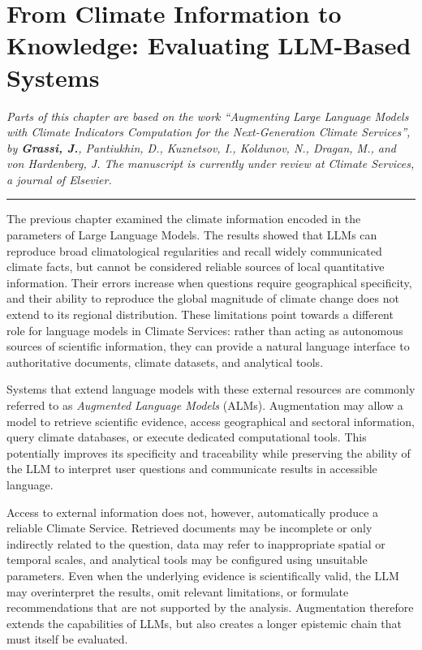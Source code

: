 \chapter{From Climate Information to Knowledge: Evaluating LLM-Based Systems}

\noindent\textit{Parts of this chapter are based on the work \emph{``Augmenting Large Language Models with Climate Indicators Computation for the Next-Generation Climate Services''}, by \textbf{Grassi, J.}, Pantiukhin, D., Kuznetsov, I., Koldunov, N., Dragan, M., and von Hardenberg, J. The manuscript is currently under review at Climate Services, a journal of Elsevier.}

\vspace{0.5em}
\begin{center}
    \rule{0.5\textwidth}{0.4pt}
\end{center}
\vspace{0.5em}


The previous chapter examined the climate information encoded in the parameters of Large Language Models. The results showed that LLMs can reproduce broad climatological regularities and recall widely communicated climate facts, but cannot be considered reliable sources of local quantitative information. Their errors increase when questions require geographical specificity, and their ability to reproduce the global magnitude of climate change does not extend to its regional distribution. These limitations point towards a different role for language models in Climate Services: rather than acting as autonomous sources of scientific information, they can provide a natural language interface to authoritative documents, climate datasets, and analytical tools.

Systems that extend language models with these external resources are commonly referred to as \emph{Augmented Language Models} (ALMs). Augmentation may allow a model to retrieve scientific evidence, access geographical and sectoral information, query climate databases, or execute dedicated computational tools. This potentially improves its specificity and traceability while preserving the ability of the LLM to interpret user questions and communicate results in accessible language.

Access to external information does not, however, automatically produce a reliable Climate Service. Retrieved documents may be incomplete or only indirectly related to the question, data may refer to inappropriate spatial or temporal scales, and analytical tools may be configured using unsuitable parameters. Even when the underlying evidence is scientifically valid, the LLM may overinterpret the results, omit relevant limitations, or formulate recommendations that are not supported by the analysis. Augmentation therefore extends the capabilities of LLMs, but also creates a longer epistemic chain that must itself be evaluated.

